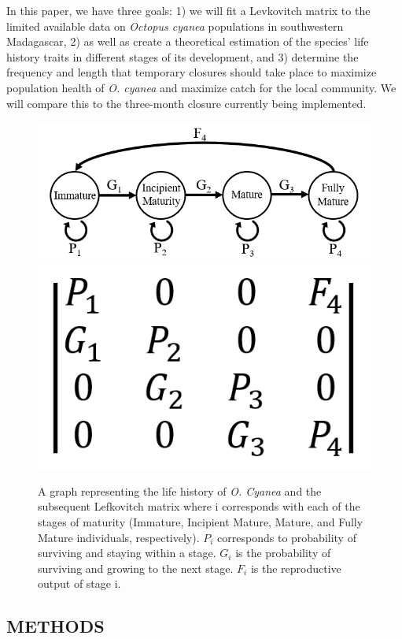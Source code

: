 \documentclass[
  12pt,
]{article}
\begin{document}
In this paper, we have three goals: 1) we will fit a Levkovitch matrix to the limited available data on \emph{Octopus cyanea} populations in southwestern Madagascar, 2) as well as create a theoretical estimation of the species' life history traits in different stages of its development, and 3) determine the frequency and length that temporary closures should take place to maximize population health of \emph{O. cyanea} and maximize catch for the local community. We will compare this to the three-month closure currently being implemented.



\begin{figure}
\includegraphics[width=0.45\linewidth]{LifeGraph} \includegraphics[width=0.45\linewidth]{MtxGeneric} \caption{A graph representing the life history of \emph{O. Cyanea} and the subsequent Lefkovitch matrix where i corresponds with each of the stages of maturity (Immature, Incipient Mature, Mature, and Fully Mature individuals, respectively). \(P_i\) corresponds to probability of surviving and staying within a stage. \(G_i\) is the probability of surviving and growing to the next stage. \(F_i\) is the reproductive output of stage i. \label{LifeGraph}}\label{fig:LifeGraph}
\end{figure}

\hypertarget{methods}{%
\subsection{METHODS}\label{methods}}
\end{document}
